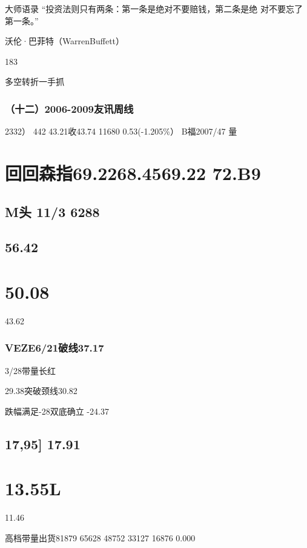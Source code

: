 \documentclass{article}
\begin{document}
大师语录 “投资法则只有两条：第一条是绝对不要赔钱，第二条是绝 对不要忘了第一条。”

沃伦·巴菲特（WarrenBuffett）

183

\clearpage

多空转折一手抓

\subsubsection{（十二）2006-2009友讯周线}

2332） 442 43.21收43.74 11680 0.53(-1.205\%） B福2007/47 量

\section{回回森指69.2268.4569.22 72.B9}

\subsection{M头 11/3 6288}

\subsection{56.42}

\section{50.08}

43.62

\subsubsection{VEZE6/21破线37.17}

3/28带量长红

29.38突破颈线30.82

跌幅满足-28双底确立 -24.37

\subsection{17,95] 17.91}

\section{13.55L}

11.46

高档带量出货81879 65628 48752 33127 16876 0.000
\end{document}
